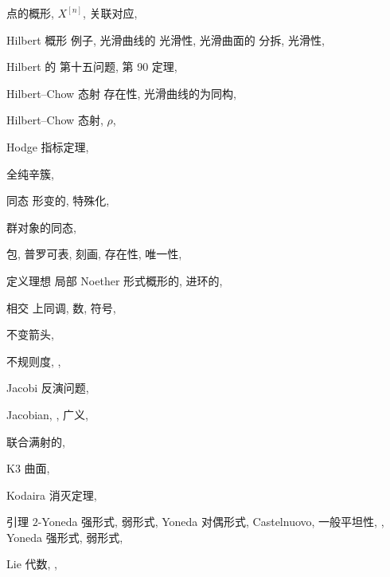 \begin{theindex}
\subitem 点的概形, $X^{[n]}$, 
\subsubitem 关联对应, 
\item Hilbert 概形
\subitem 例子, 
\subitem 光滑曲线的
\subsubitem 光滑性, 
\subitem 光滑曲面的
\subsubitem 分拆, 
\subsubitem 光滑性, 
\item Hilbert 的
\subitem 第十五问题, 
\subitem 第 90 定理, 
\item Hilbert--Chow 态射
\subitem 存在性, 
\subitem 光滑曲线的为同构, 
\item Hilbert--Chow 态射, $\rho$, 
\item Hodge 指标定理, 
\item 全纯辛簇, 
\item 同态
\subitem 形变的, 
\subitem 特殊化, 
\item 群对象的同态, 
\item 包, 普罗可表, 
\subitem 刻画, 
\subitem 存在性, 
\subitem 唯一性, 
\indexspace
\item 定义理想
\subitem 局部 Noether 形式概形的, 
\subitem 进环的, 
\item 相交
\subitem 上同调, 
\subitem 数, 
\subitem 符号, 
\item 不变箭头, 
\item 不规则度, , 
\indexspace
\item Jacobi 反演问题, 
\item Jacobian, , 
\subitem 广义, 
\item 联合满射的, 
\indexspace
\item K3 曲面, 
\item Kodaira 消灭定理, 
\indexspace
\item 引理
\subitem $2$-Yoneda
\subsubitem 强形式, 
\subsubitem 弱形式, 
\subitem Yoneda
\subsubitem 对偶形式, 
\subitem Castelnuovo, 
\subitem 一般平坦性, , 
\subitem Yoneda
\subsubitem 强形式, 
\subsubitem 弱形式, 
\item Lie 代数, , 

\end{theindex}
